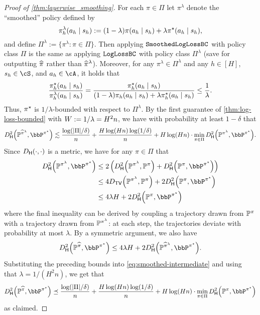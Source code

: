 \begin{proof}[Proof of \cref{thm:layerwise_smoothing}]
For each $\pi \in \Pi$ let $\pi^\lambda$ denote the ``smoothed'' policy defined by
\[\pi^\lambda_h(a_h\mid{}s_h) := (1-\lambda)\pi(a_h\mid{}s_h) + \lambda\pi^{\star}(a_h\mid{}s_h),\]
and define $\Pi^\lambda := \{\pi^\lambda: \pi \in \Pi\}$. Then applying $\texttt{SmoothedLogLossBC}$ with policy class $\Pi$ is the same as applying $\texttt{LogLossBC}$ with policy class $\Pi^\lambda$ (save for outputting $\widehat{\pi}$ rather than $\widehat{\pi}^\lambda$). Moreover, for any $\pi^\lambda \in \Pi^\lambda$ and any $h \in [H]$, $s_h \in \cS$, and $a_h \in \cA$, it holds that
\[\frac{\pi^{\star}_h(a_h\mid{}s_h)}{\pi^\lambda_h(a_h\mid{}s_h)} = \frac{\pi^{\star}_h(a_h\mid{}s_h)}{(1-\lambda)\pi_h(a_h\mid{}s_h) + \lambda \pi^{\star}_h(a_h\mid{}s_h)} \leq \frac{1}{\lambda}.\]
Thus, $\pi^{\star}$ is $1/\lambda$-bounded with respect to $\Pi^\lambda$. By the first guarantee of \cref{thm:log-loss-bounded} with $W := 1/\lambda = H^2 n$, we have with probability at least $1-\delta$ that 
\begin{equation} \Dhels{\BP^{\pihat^\lambda}}{\bbP^{\pistar}} \lesssim \frac{\log(|\Pi|/\delta)}{n} + \frac{H\log(Hn)\log(1/\delta)}{n} + H\log(Hn) \cdot \min_{\pi\in\Pi} \Dhels{\BP^{\pi^\lambda}}{\bbP^{\pistar}}.\label{eq:smoothed-intermediate}
\end{equation}
Since $\Dhel{\cdot}{\cdot}$ is a metric, we have for any $\pi \in \Pi$ that
\begin{align} 
\Dhels{\BP^{\pi^\lambda}}{\bbP^{\pistar}} 
&\leq 2\left(\Dhels{\BP^{\pi^\lambda}}{\BP^\pi} + \Dhels{\BP^\pi}{\bbP^{\pistar}}\right) \\
&\leq 4\Dtv{\BP^{\pi^\lambda}}{\BP^\pi} + 2\Dhels{\BP^\pi}{\bbP^{\pistar}} \\
&\leq 4\lambda H + 2\Dhels{\BP^\pi}{\bbP^{\pistar}}
\end{align}
where the final inequality can be derived by coupling a trajectory drawn from $\mathbb{P}^\pi$ with a trajectory drawn from $\mathbb{P}^{\pi^\lambda}$: at each step, the trajectories deviate with probability at most $\lambda$. By a symmetric argument, we also have
\[\Dhels{\BP^{\pihat}}{\bbP^{\pistar}} \leq 4\lambda H + 2\Dhels{\BP^{\pihat^\lambda}}{\bbP^{\pistar}}.\]
Substituting the preceding bounds into \cref{eq:smoothed-intermediate} and using that $\lambda = 1/(H^2 n)$, we get that
\[\Dhels{\BP^{\pihat}}{\bbP^{\pistar}} \preceq \frac{\log(|\Pi|/\delta)}{n} + \frac{H\log(Hn)\log(1/\delta)}{n} + H\log(Hn) \cdot \min_{\pi \in \Pi} \Dhels{\BP^\pi}{\bbP^{\pistar}}\]
as claimed.
\end{proof}
